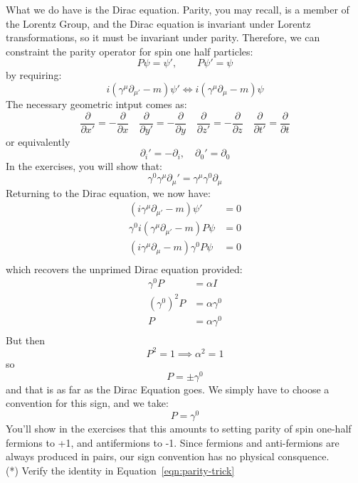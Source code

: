 \documentclass[12pt]{article}
\begin{document}
What we do have is the Dirac equation.  Parity, you may recall, is a
member of the Lorentz Group, and the Dirac equation is invariant under
Lorentz transformations, so it must be invariant under parity.
Therefore, we can constraint the parity operator for spin one half
particles:
$$P \psi = \psi', \quad \quad P \psi' = \psi$$
by requiring:
$$i (\gamma^\mu \partial_{\mu'}-m) \psi' \iff i (\gamma^\mu \partial_\mu-m) \psi$$
The necessary geometric intput comes as:
$$\frac{\partial}{\partial x'}= -\frac{\partial}{\partial x} \quad
\frac{\partial}{\partial y'}= -\frac{\partial}{\partial y} \quad
\frac{\partial}{\partial z'}= -\frac{\partial}{\partial z} \quad
\frac{\partial}{\partial t'}= \frac{\partial}{\partial t}
$$
or equivalently
$$\partial_i' = - \partial_i, \quad \partial_0' = \partial_0$$
In the exercises, you will show that:
\begin{equation}
\label{eqn:parity-trick}
\gamma^0 \gamma^\mu \partial_\mu' = \gamma^\mu \gamma^0 \partial_\mu
\end{equation}
Returning to the Dirac equation, we now have:
\begin{align*}
   (i\gamma^\mu \partial_{\mu'}-m) \psi' &= 0 \\
  \gamma^0 i (\gamma^\mu \partial_{\mu'}-m) P \psi &= 0 \\
   (i\gamma^\mu \partial_{\mu}-m) \gamma^0 P \psi &= 0 \\
\end{align*}
which recovers the unprimed Dirac equation provided:
\begin{align}
  \gamma^0 P &= \alpha I \\
  (\gamma^0)^2 P &= \alpha \gamma^0 \\
  P &= \alpha \gamma^0 \\
\end{align}
But then
$$P^2 = 1 \implies \alpha^2 = 1$$
so
$$P = \pm \gamma^0$$
and that is as far as the Dirac Equation goes.  We simply have to
choose a convention for this sign, and we take:
\begin{equation}
P = \gamma^0
\end{equation}
You'll show in the exercises that this amounts to setting parity of
spin one-half fermions to +1, and antifermions to -1. Since fermions
and anti-fermions are always produced in pairs, our sign convention
has no physical consquence.\\

\exercise (*) Verify the identity in Equation~\ref{eqn:parity-trick} \\
\end{document}
